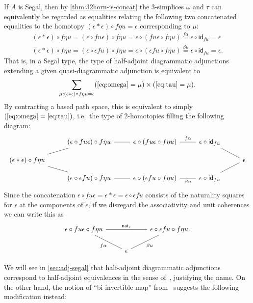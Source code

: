\documentclass[12pt]{amsart}
\theoremstyle{plain}
\theoremstyle{definition}
\theoremstyle{remark}
\numberwithin{equation}{section}
\newcommand{\idarr}[1]{\mathsf{id}_{#1}}
\begin{document}
If $A$ is Segal, then by \cref{thm:32horn-is-concat} the 3-simplices $\omega$ and $\tau$ can equivalently be regarded as equalities relating the following two concatenated equalities to the homotopy $(\epsilon\ast\epsilon) \circ f\eta u = \epsilon$ corresponding to $\mu$:
\begin{gather}
  (\epsilon\ast\epsilon) \circ f\eta u
  = (\epsilon \circ fu\epsilon) \circ f\eta u
  = \epsilon \circ (fu\epsilon \circ f\eta u)
  \overset{f\alpha}= \epsilon \circ \idarr{fu}
  = \epsilon \label{eq:omega}\\
  (\epsilon\ast\epsilon) \circ f\eta u
  = (\epsilon \circ \epsilon fu)\circ f\eta u
  = \epsilon \circ (\epsilon fu\circ f\eta u)
  \overset{\beta u}= \epsilon \circ \idarr{fu}
  = \epsilon.\label{eq:tau}
\end{gather}
That is, in a Segal type, the type of half-adjoint diagrammatic adjunctions extending a given quasi-diagrammatic adjunction is equivalent to
\[ \sum_{\mu:(\epsilon\ast\epsilon) \circ f\eta u = \epsilon} (\eqref{eq:omega}=\mu) \times (\eqref{eq:tau}=\mu). \]
By contracting a based path space, this is equivalent to simply $(\eqref{eq:omega}=\eqref{eq:tau})$, i.e.\ the type of 2-homotopies filling the following diagram:
\[
\begin{tikzcd}[row sep=small]
  & (\epsilon \circ fu\epsilon) \circ f\eta u \ar[r,-] &
  \epsilon \circ (fu\epsilon \circ f\eta u) \ar[r,-,"f\alpha"] &
  \epsilon \circ \idarr{fu} \ar[dr,-]\\
  (\epsilon\ast\epsilon) \circ f\eta u \ar[ur,-] \ar[dr,-] &&&& \epsilon\\
  & (\epsilon \circ \epsilon fu)\circ f\eta u \ar[r,-] &
  \epsilon \circ (\epsilon fu\circ f\eta u) \ar[r,-,"\beta u"'] &
  \epsilon \circ \idarr{fu} \ar[ur,-]
\end{tikzcd}
\]
Since the concatenation $\epsilon \circ fu\epsilon = \epsilon\ast\epsilon = \epsilon \circ \epsilon fu$ consists of the naturality squares for $\epsilon$ at the components of $\epsilon$, if we disregard the associativity and unit coherences we can write this as
\[
\begin{tikzcd}     \epsilon \circ fu\epsilon \circ f\eta u \ar[rr,-,"{\mathsf{nat}_\epsilon}"]  \ar[dr,-,"f\alpha"']  & &   \epsilon \circ \epsilon fu \circ f\eta u. \ar[dl,-,"\beta u"] \\ & \epsilon &
\end{tikzcd}
\]

We will see in \cref{sec:adj-segal} that half-adjoint diagrammatic adjunctions correspond to half-adjoint equivalences in the sense of~\cite[\S4.2]{hottbook}, justifying the name.
On the other hand, the notion of ``bi-invertible map'' from~\cite[\S4.3]{hottbook} suggests the following modification instead:
\end{document}
